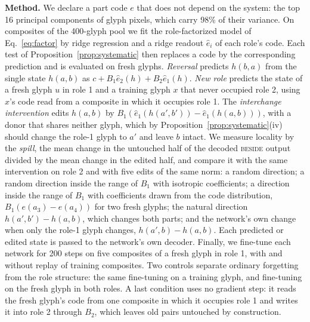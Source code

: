 \documentclass[10pt]{article}
\theoremstyle{plain}
\theoremstyle{remark}
\begin{document}
\textbf{Method.} We declare a part code $e$ that does not depend on the system: the top 16 principal components of glyph pixels, which carry 98\% of their variance. On composites of the 400-glyph pool we fit the role-factorized model of Eq.~\eqref{eq:factor} by ridge regression and a ridge readout $\hat{e}_i$ of each role's code. Each test of Proposition~\ref{prop:systematic} then replaces a code by the corresponding prediction and is evaluated on fresh glyphs. \emph{Reversal} predicts $h(b, a)$ from the single state $h(a, b)$ as $c + B_1 \hat{e}_2(h) + B_2 \hat{e}_1(h)$. \emph{New role} predicts the state of a fresh glyph $u$ in role 1 and a training glyph $x$ that never occupied role 2, using $x$'s code read from a composite in which it occupies role 1. The \emph{interchange intervention} edits $h(a, b)$ by $B_1(\hat{e}_1(h(a', b')) - \hat{e}_1(h(a, b)))$, with a donor that shares neither glyph, which by Proposition~\ref{prop:systematic}(iv) should change the role-1 glyph to $a'$ and leave $b$ intact. We measure locality by the \emph{spill}, the mean change in the untouched half of the decoded \textsc{beside} output divided by the mean change in the edited half, and compare it with the same intervention on role 2 and with five edits of the same norm: a random direction; a random direction inside the range of $B_1$ with isotropic coefficients; a direction inside the range of $B_1$ with coefficients drawn from the code distribution, $B_1(e(a_3) - e(a_4))$ for two fresh glyphs; the natural direction $h(a', b') - h(a, b)$, which changes both parts; and the network's own change when only the role-1 glyph changes, $h(a', b) - h(a, b)$. Each predicted or edited state is passed to the network's own decoder. Finally, we fine-tune each network for 200 steps on five composites of a fresh glyph in role 1, with and without replay of training composites. Two controls separate ordinary forgetting from the role structure: the same fine-tuning on a training glyph, and fine-tuning on the fresh glyph in both roles. A last condition uses no gradient step: it reads the fresh glyph's code from one composite in which it occupies role 1 and writes it into role 2 through $B_2$, which leaves old pairs untouched by construction.
\end{document}
